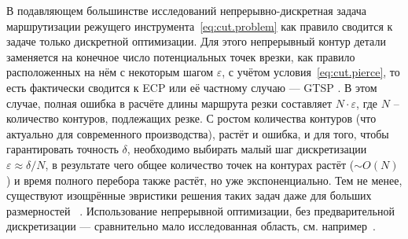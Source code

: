 В подавляющем большинстве исследований
непрерывно-дискретная
задача маршрутизации режущего инструмента~\eqref{eq:cut.problem}
как правило сводится
к задаче только дискретной оптимизации.
Для этого непрерывный контур детали
заменяется на конечное число
потенциальных точек врезки,
как правило расположенных на нём
с некоторым шагом
$\varepsilon$,
с учётом условия~\eqref{eq:cut.pierce},
то есть фактически сводится к
ECP
\cite{bi:Dewil2014,bi:Sherif2014,bi:Imahori2008}
или её частному случаю ---
GTSP
\cite{bi:Chentsov2018,bi:Petunin2017Apr,bi:Ye2013,bi:Yu}.
В этом случае,
полная ошибка в расчёте длины маршрута резки
составляет
$N \cdot \varepsilon$,
где
$N$
-- количество контуров,
подлежащих резке.
С ростом количества контуров
(что актуально для современного производства),
растёт и ошибка,
и для того,
чтобы гарантировать точность
$\delta$,
необходимо выбирать малый шаг дискретизации
$\varepsilon \approx \delta / N$,
в результате чего
общее количество точек на контурах растёт
($\sim O (N)$)
и время полного перебора также растёт,
но уже экспоненциально.
Тем не менее,
существуют изощрённые эвристики
решения таких задач даже для больших размерностей
~\cite{bi:RoMa}.
Использование непрерывной оптимизации,
без предварительной дискретизации ---
сравнительно мало исследованная область,
см. например~\cite{bi:Arkin1994,bi:Vicencio}.
